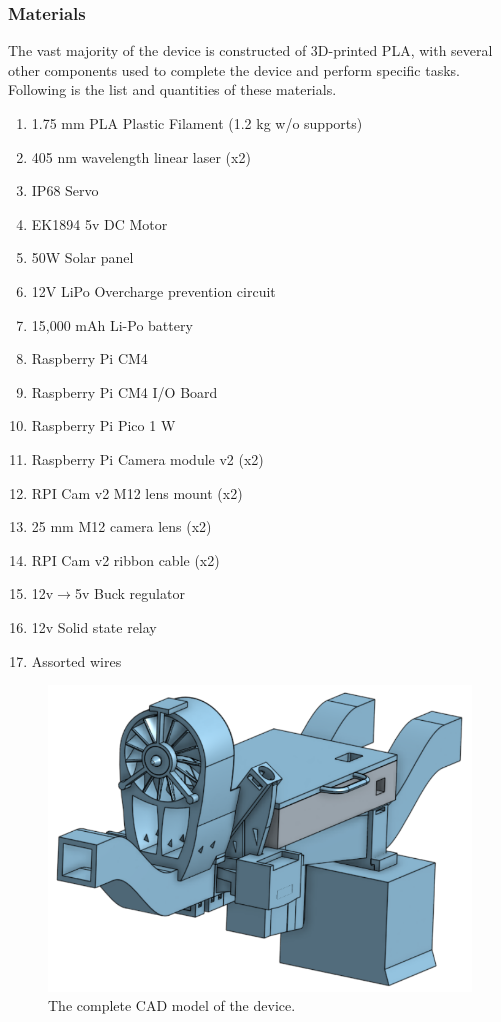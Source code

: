 \documentclass[fleqn,10pt]{SelfArx} %
\begin{document}
\begin{enumerate}
		
		
	\end{enumerate}
	\subsubsection{Materials}
	The vast majority of the device is constructed of 3D-printed PLA, with several other components used to complete the device and perform specific tasks. Following is the list and quantities of these materials.
	
	\begin{enumerate}
		
		\item 1.75 mm PLA Plastic Filament (1.2 kg w/o supports)
		\item 405 nm wavelength linear laser (x2)
		\item IP68 Servo
		\item EK1894 5v DC Motor
		\item 50W Solar panel
		\item 12V LiPo Overcharge prevention circuit
		\item 15,000 mAh Li-Po battery
		\item Raspberry Pi CM4
		\item Raspberry Pi CM4 I/O Board
		\item Raspberry Pi Pico 1 W
		\item Raspberry Pi Camera module v2 (x2)
		\item \gls{RPI} Cam v2 M12 lens mount (x2)
		\item 25 mm M12 camera lens (x2)
		\item \gls{RPI} Cam v2 ribbon cable (x2)
		\item 12v$\rightarrow$5v Buck regulator
		\item 12v Solid state relay
		\item Assorted wires
		
	\end{enumerate}
	
	\begin{figure}[h]
		\centering
		\includegraphics[width=1\linewidth]{Figures/CADFull}
		\caption[Complete 3D Model]{The complete CAD model of the device.}
		\label{fig:FullCAD}
	\end{figure}
\end{document}
